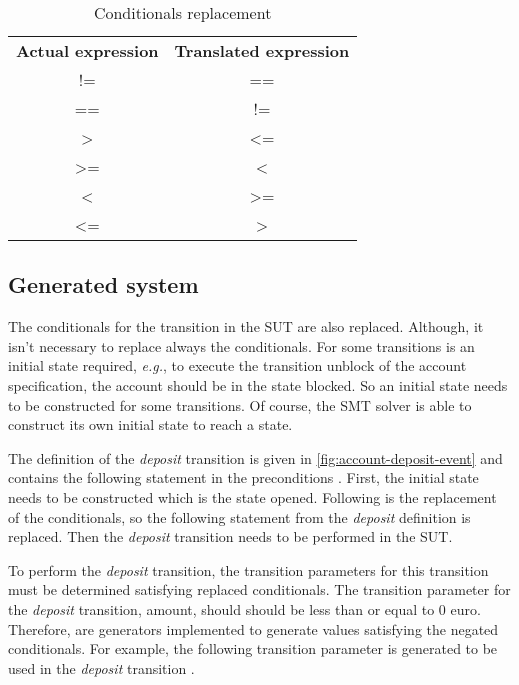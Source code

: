 \begin{table}[h!]
\centering
\begin{tabular}{cc}
\textbf{Actual expression} & \textbf{Translated expression} \\
!=                         & ==                             \\
==                         & !=                             \\
\textgreater               & \textless=                     \\
\textgreater=              & \textless                      \\
\textless                  & \textgreater=                  \\
\textless=                 & \textgreater                   \\
\end{tabular}
\caption{Conditionals replacement}\label{fig:table-replacement-conditions}
\end{table}

\subsection{Generated system}
The conditionals for the transition in the SUT are also replaced.
Although, it isn't necessary to replace always the conditionals. For some
transitions is an initial state required, \textit{e.g.}, to execute the transition unblock
of the account specification, the account should be in the state blocked. So an
initial state needs to be constructed for some transitions. Of course, the SMT
solver is able to construct its own initial state to reach a state.

The definition of the \textit{deposit} transition is given in
\autoref{fig:account-deposit-event} and contains the following statement in the
preconditions . First, the initial state needs to be
constructed which is the state opened. Following is the replacement of the conditionals, so the
following statement from the \textit{deposit} definition  is
replaced. Then the \textit{deposit} transition needs to be performed in the SUT.

To perform the \textit{deposit} transition, the transition parameters for this
transition must be determined satisfying replaced conditionals. The transition
parameter for the \textit{deposit} transition, amount, should should be less
than or equal to 0 euro. Therefore, are generators implemented to generate
values satisfying the negated conditionals. For example, the following
transition parameter is generated to be used in the \textit{deposit} transition
.

